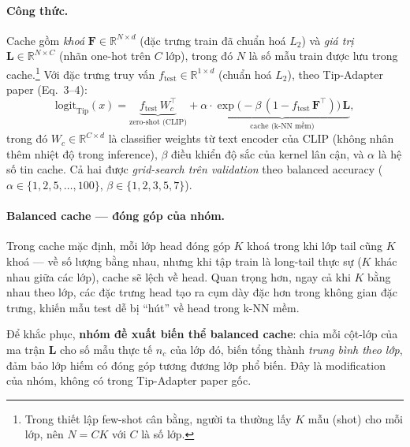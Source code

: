 \paragraph{Công thức.}
Cache gồm \emph{khoá} $\mathbf{F} \in \mathbb{R}^{N \times d}$ (đặc trưng train đã chuẩn hoá $L_2$)
và \emph{giá trị} $\mathbf{L} \in \mathbb{R}^{N \times C}$ (nhãn one-hot trên $C$ lớp), trong đó $N$
là số mẫu train được lưu trong cache.\footnote{Trong thiết lập few-shot cân bằng, người ta thường
lấy $K$ mẫu (shot) cho mỗi lớp, nên $N = CK$ với $C$ là số lớp.} Với đặc trưng truy vấn $f_\text{test} \in \mathbb{R}^{1 \times d}$ (chuẩn hoá $L_2$), theo
Tip-Adapter paper (Eq.~3--4):
\begin{equation}
\text{logit}_{\text{Tip}}(x)
  = \underbrace{f_\text{test}\, W_c^\top}_{\text{zero-shot (CLIP)}}
  + \alpha \cdot \underbrace{\exp\!\bigl(-\beta\,(1 - f_\text{test}\,\mathbf{F}^\top)\bigr)\,\mathbf{L}}_{\text{cache (k-NN mềm)}},
\label{eq:tip}
\end{equation}
trong đó $W_c \in \mathbb{R}^{C \times d}$ là classifier weights từ text encoder của CLIP (không nhân
thêm nhiệt độ trong inference), $\beta$ điều khiển độ sắc của kernel lân cận, và $\alpha$ là hệ số
tin cache. Cả hai được \emph{grid-search trên validation} theo balanced accuracy
($\alpha \in \{1,2,5,\ldots,100\}$, $\beta \in \{1,2,3,5,7\}$).
 
\paragraph{Balanced cache --- đóng góp của nhóm.}
Trong cache mặc định, mỗi lớp head đóng góp $K$ khoá trong khi lớp tail cũng $K$ khoá --- về số
lượng bằng nhau, nhưng khi tập train là long-tail thực sự ($K$ khác nhau giữa các lớp), cache sẽ
lệch về head. Quan trọng hơn, ngay cả khi $K$ bằng nhau theo lớp, các đặc trưng head tạo ra cụm dày
đặc hơn trong không gian đặc trưng, khiến mẫu test dễ bị ``hút'' về head trong k-NN mềm.
 
Để khắc phục, \textbf{nhóm đề xuất biến thể balanced cache}: chia mỗi cột-lớp của ma trận $\mathbf{L}$ cho số mẫu thực tế $n_c$ của lớp đó, biến tổng thành \emph{trung bình theo lớp}, đảm bảo lớp hiếm có đóng góp tương đương lớp phổ biến. Đây là modification của nhóm, không có trong Tip-Adapter paper gốc.
 


